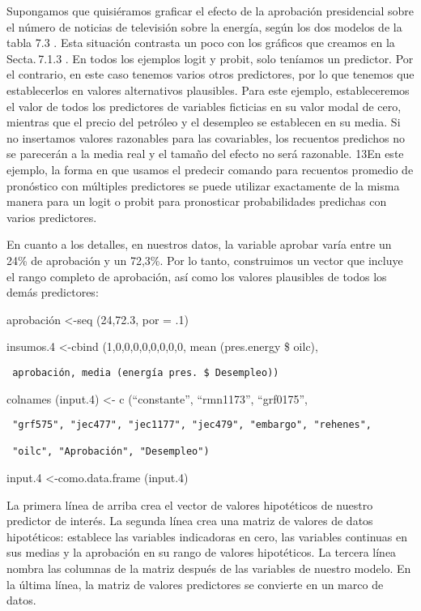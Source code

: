 \documentclass[
]{book}
\begin{document}
Supongamos que quisiéramos graficar el efecto de la aprobación presidencial sobre el número de noticias de televisión sobre la energía, según los dos modelos de la tabla 7.3 . Esta situación contrasta un poco con los gráficos que creamos en la Secta. 7.1.3 . En todos los ejemplos logit y probit, solo teníamos un predictor. Por el contrario, en este caso tenemos varios otros predictores, por lo que tenemos que establecerlos en valores alternativos plausibles. Para este ejemplo, estableceremos el valor de todos los predictores de variables ficticias en su valor modal de cero, mientras que el precio del petróleo y el desempleo se establecen en su media. Si no insertamos valores razonables para las covariables, los recuentos predichos no se parecerán a la media real y el tamaño del efecto no será razonable. 13En este ejemplo, la forma en que usamos el predecir comando para recuentos promedio de pronóstico con múltiples predictores se puede utilizar exactamente de la misma manera para un logit o probit para pronosticar probabilidades predichas con varios predictores.

En cuanto a los detalles, en nuestros datos, la variable aprobar varía entre un 24\% de aprobación y un 72,3\%. Por lo tanto, construimos un vector que incluye el rango completo de aprobación, así como los valores plausibles de todos los demás predictores:

aprobación \textless-seq (24,72.3, por = .1)

insumos.4 \textless-cbind (1,0,0,0,0,0,0,0,0, mean (pres.energy \$ oilc),

\begin{verbatim}
 aprobación, media (energía pres. $ Desempleo))
\end{verbatim}

colnames (input.4) \textless- c (``constante'', ``rmn1173'', ``grf0175'',

\begin{verbatim}
 "grf575", "jec477", "jec1177", "jec479", "embargo", "rehenes",

 "oilc", "Aprobación", "Desempleo")
\end{verbatim}

input.4 \textless-como.data.frame (input.4)

La primera línea de arriba crea el vector de valores hipotéticos de nuestro predictor de interés. La segunda línea crea una matriz de valores de datos hipotéticos: establece las variables indicadoras en cero, las variables continuas en sus medias y la aprobación en su rango de valores hipotéticos. La tercera línea nombra las columnas de la matriz después de las variables de nuestro modelo. En la última línea, la matriz de valores predictores se convierte en un marco de datos.
\end{document}
